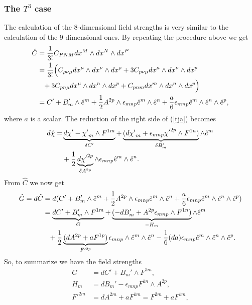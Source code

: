 \subsubsection{The $T^3$ case}
The calculation of the 8-dimensional field strengths is very similar to the calculation of the 9-dimensional ones.
By repeating the procedure above we get
\begin{align}
\hat{C} &= {1 \over {3!}} C_{PNM}dx^M \wedge dx^N \wedge dx^P \nonumber \\
&= {1 \over {3!}}\Big{(}C_{\rho \nu \mu}dx^{\mu} \wedge dx^{\nu} \wedge dx^{\rho} + 3C_{p \nu \mu}dx^{\mu} \wedge dx^{\nu} \wedge dx^{p} \nonumber \\
&\phantom{=} + 3 C_{p n \mu}dx^{\mu} \wedge dx^{n} \wedge dx^{p} +C_{pnm}dx^{m} \wedge dx^{n} \wedge dx^{p}\Big{)}\nonumber \\
&= C' + B_{m}' \wedge \hat{e}^m + {1 \over 2}A^{2p} \wedge {\epsilon}_{mnp}\hat{e}^m \wedge \hat{e}^n +{a \over 6}{\epsilon}_{mnp}\hat{e}^m \wedge \hat{e}^n \wedge \hat{e}^p,
\label{olle}
\end{align}
where $a$ is a scalar. The reduction of the right side of (\ref{tja}) becomes
\begin{align}
d\hat{\chi}=&\underbrace{d\chi'-{\chi'}_m \wedge F^{1m}}_{\delta C'}+ \underbrace{(d{\chi'}_m + {\epsilon}_{mnp}{\chi'}^{2p} \wedge F^{1n})}_{\delta B_{m}'} \wedge \hat{e}^m \nonumber \\
&+{1 \over 2} \underbrace{d{\chi'}^{2p}}_{\delta A^{2p}} \wedge {\epsilon}_{mnp} \hat{e}^m \wedge \hat{e}^n.
\end{align}
From $\hat C$ we now get
\begin{align}
\hat{G}=d\hat{C}&= d(C' + B_{m}' \wedge \hat{e}^m + {1 \over 2}A^{2p} \wedge {\epsilon}_{mnp}\hat{e}^m \wedge \hat{e}^n + {a \over 6}{\epsilon}_{mnp}\hat{e}^m \wedge \hat{e}^n \wedge \hat{e}^p) \nonumber \\
&= \underbrace{dC' + B_{m}' \wedge F^{1m}}_{G} + \underbrace{(-dB_{m}' + A^{2p} {\epsilon}_{mnp} \wedge F^{1n})}_{-H_m} \wedge \hat{e}^m \nonumber \\
&\phantom{=}+ {1 \over 2} \underbrace{(dA^{2p} + aF^{1p})}_{F'^{2p}} {\epsilon}_{mnp} \wedge \hat{e}^m \wedge \hat{e}^n - {1 \over 6}(da){\epsilon}_{mnp}\hat{e}^m \wedge \hat{e}^n \wedge \hat{e}^p.
\label{kalle2}
\end{align}
So, to summarize we have the field strengths
\begin{align}
G &= dC' + B_{m}' \wedge F^{1m}, \nonumber \\
H_m &= dB_{m}' -  {\epsilon}_{mnp} F^{1n}\wedge A^{2p}, \nonumber \\
F'^{2m} &= dA^{2m} + aF^{1m} = F^{2m} + aF^{1m},
\label{hej}
\end{align}
